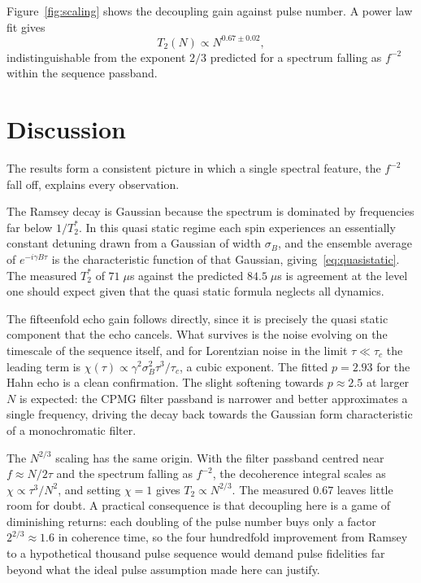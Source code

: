 \documentclass[10pt,twocolumn,a4paper]{article}
\begin{document}
Figure~\ref{fig:scaling} shows the decoupling gain against pulse number. A power
law fit gives
\begin{equation}
T_2(N) \propto N^{0.67 \pm 0.02},
\end{equation}
indistinguishable from the exponent $2/3$ predicted for a spectrum falling as
$f^{-2}$ within the sequence passband.

\section{Discussion}\label{sec:discussion}

The results form a consistent picture in which a single spectral feature, the
$f^{-2}$ fall off, explains every observation.

The Ramsey decay is Gaussian because the spectrum is dominated by frequencies far
below $1/T_2^{*}$. In this quasi static regime each spin experiences an
essentially constant detuning drawn from a Gaussian of width $\sigma_B$, and the
ensemble average of $e^{-i\gamma B\tau}$ is the characteristic function of that
Gaussian, giving~\eqref{eq:quasistatic}. The measured $T_2^{*}$ of $71\;\mu$s
against the predicted $84.5\;\mu$s is agreement at the level one should expect
given that the quasi static formula neglects all dynamics.

The fifteenfold echo gain follows directly, since it is precisely the quasi static
component that the echo cancels. What survives is the noise evolving on the
timescale of the sequence itself, and for Lorentzian noise in the limit
$\tau \ll \tau_c$ the leading term is
$\chi(\tau) \propto \gamma^2 \sigma_B^2 \tau^3/\tau_c$, a cubic exponent. The
fitted $p = 2.93$ for the Hahn echo is a clean confirmation. The slight softening
towards $p \approx 2.5$ at larger $N$ is expected: the CPMG filter passband is
narrower and better approximates a single frequency, driving the decay back
towards the Gaussian form characteristic of a monochromatic filter.

The $N^{2/3}$ scaling has the same origin. With the filter passband centred near
$f \approx N/2\tau$ and the spectrum falling as $f^{-2}$, the decoherence integral
scales as $\chi \propto \tau^3/N^2$, and setting $\chi = 1$ gives
$T_2 \propto N^{2/3}$. The measured $0.67$ leaves little room for doubt. A
practical consequence is that decoupling here is a game of diminishing returns:
each doubling of the pulse number buys only a factor $2^{2/3} \approx 1.6$ in
coherence time, so the four hundredfold improvement from Ramsey to a
hypothetical thousand pulse sequence would demand pulse fidelities far beyond what
the ideal pulse assumption made here can justify.
\end{document}
